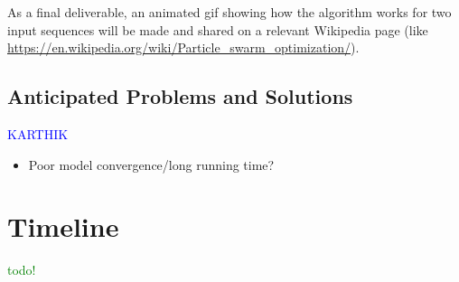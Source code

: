 \documentclass{article}
\begin{document}
  As a final deliverable, an animated gif showing how the algorithm works for two input sequences will be made and shared on a relevant Wikipedia page (like \url{https://en.wikipedia.org/wiki/Particle_swarm_optimization/}).
\subsection{Anticipated Problems and Solutions}
\textcolor{blue}{KARTHIK} \\
\begin{itemize}
	\item Poor model convergence/long running time?
\end{itemize}
\pagebreak
\section{Timeline}
\textcolor{green}{todo!} \\
\pagebreak
\end{document}
